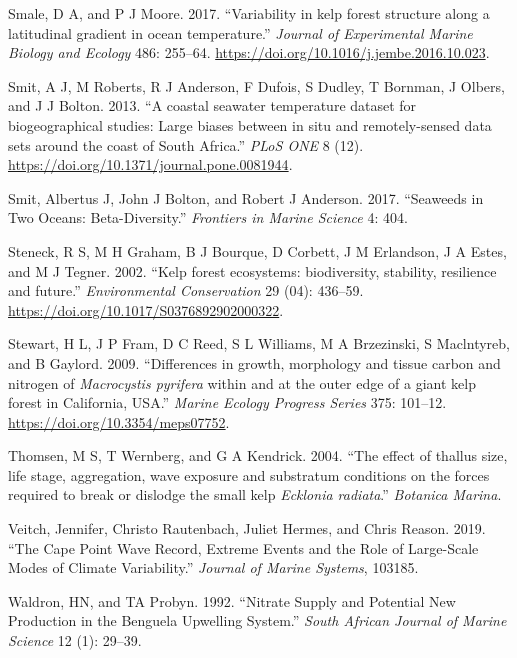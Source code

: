 \documentclass[
  a4paper,
]{article}
\begin{document}
\leavevmode\hypertarget{ref-Smale2017}{}%
Smale, D A, and P J Moore. 2017. ``Variability in kelp forest structure
along a latitudinal gradient in ocean temperature.'' \emph{Journal of
Experimental Marine Biology and Ecology} 486: 255--64.
\url{https://doi.org/10.1016/j.jembe.2016.10.023}.

\leavevmode\hypertarget{ref-Smit2013a}{}%
Smit, A J, M Roberts, R J Anderson, F Dufois, S Dudley, T Bornman, J
Olbers, and J J Bolton. 2013. ``A coastal seawater temperature dataset
for biogeographical studies: Large biases between in situ and
remotely-sensed data sets around the coast of South Africa.'' \emph{PLoS
ONE} 8 (12). \url{https://doi.org/10.1371/journal.pone.0081944}.

\leavevmode\hypertarget{ref-Smit2017}{}%
Smit, Albertus J, John J Bolton, and Robert J Anderson. 2017. ``Seaweeds
in Two Oceans: Beta-Diversity.'' \emph{Frontiers in Marine Science} 4:
404.

\leavevmode\hypertarget{ref-Steneck2002}{}%
Steneck, R S, M H Graham, B J Bourque, D Corbett, J M Erlandson, J A
Estes, and M J Tegner. 2002. ``Kelp forest ecosystems: biodiversity,
stability, resilience and future.'' \emph{Environmental Conservation} 29
(04): 436--59. \url{https://doi.org/10.1017/S0376892902000322}.

\leavevmode\hypertarget{ref-Stewart2009}{}%
Stewart, H L, J P Fram, D C Reed, S L Williams, M A Brzezinski, S
Maclntyreb, and B Gaylord. 2009. ``Differences in growth, morphology and
tissue carbon and nitrogen of \emph{Macrocystis pyrifera} within and at
the outer edge of a giant kelp forest in California, USA.'' \emph{Marine
Ecology Progress Series} 375: 101--12.
\url{https://doi.org/10.3354/meps07752}.

\leavevmode\hypertarget{ref-Thomsen2004}{}%
Thomsen, M S, T Wernberg, and G A Kendrick. 2004. ``The effect of
thallus size, life stage, aggregation, wave exposure and substratum
conditions on the forces required to break or dislodge the small kelp
\emph{Ecklonia radiata}.'' \emph{Botanica Marina}.

\leavevmode\hypertarget{ref-Veitch2019}{}%
Veitch, Jennifer, Christo Rautenbach, Juliet Hermes, and Chris Reason.
2019. ``The Cape Point Wave Record, Extreme Events and the Role of
Large-Scale Modes of Climate Variability.'' \emph{Journal of Marine
Systems}, 103185.

\leavevmode\hypertarget{ref-Waldron1992}{}%
Waldron, HN, and TA Probyn. 1992. ``Nitrate Supply and Potential New
Production in the Benguela Upwelling System.'' \emph{South African
Journal of Marine Science} 12 (1): 29--39.
\end{document}
